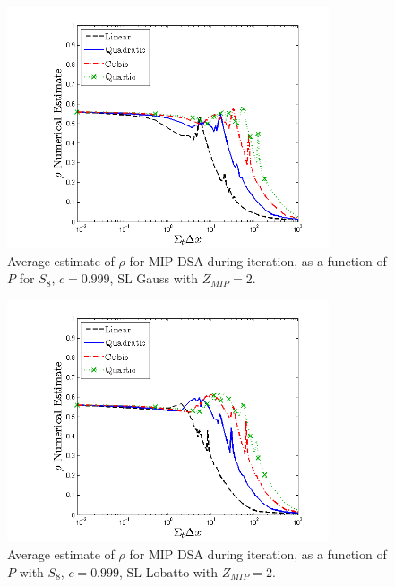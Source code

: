 \pagebreak

\begin{figure}[!htp]
\centering
\includegraphics[width=9.5cm]{chapter4_acceleration/Const_2_bar_Constant_XS_SN8_MIP_Gauss.png}
\caption{Average estimate of $\rho$ for MIP DSA during iteration, as a function of $P$ for  $S_8$, $c=0.999$, SL Gauss with $Z_{MIP}=2$.}
\label{fig:mip_gauss_c2_bar}
\end{figure}
%
\begin{figure}[!hbp]
\centering
\includegraphics[width=9.5cm]{chapter4_acceleration/Const_2_bar_Constant_XS_SN8_MIP_Lobatto.png}
\caption{Average estimate of $\rho$ for MIP DSA during iteration, as a function of $P$ with $S_8$, $c=0.999$,  SL Lobatto with $Z_{MIP}=2$.}
\label{fig:mip_lobatto_c2_bar}
\end{figure}

\pagebreak

